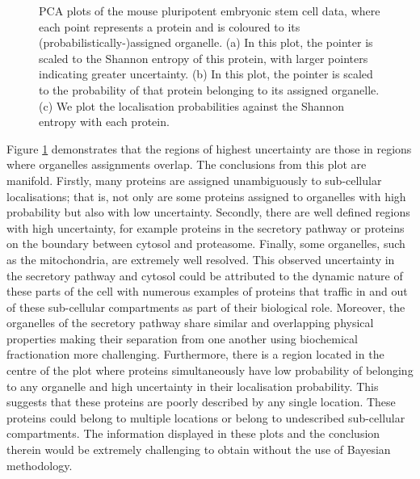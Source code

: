 \documentclass[12pt,english]{article}\usepackage[]{graphicx}\usepackage[]{color}
\newenvironment{knitrout}{}{} %
\begin{document}
\begin{figure}[h]
\begin{subfigure}[t]{0.5\textwidth}
\begin{knitrout}
{}



\end{knitrout}
    \caption{}
  \end{subfigure}

  \caption{PCA plots of the mouse pluripotent embryonic stem cell data, where
    each point represents a protein and is coloured
    to its (probabilistically-)assigned organelle. (a) In this plot, the pointer is
    scaled to the Shannon entropy of this protein, with
    larger pointers indicating greater uncertainty.
    (b) In this plot, the pointer is scaled to the probability
    of that protein belonging to its assigned organelle. (c) We plot
    the localisation probabilities against the Shannon entropy
    with each protein.}
  \label{figure:proteomeuncertainty}
 \end{figure}

Figure \ref{figure:proteomeuncertainty} demonstrates that the regions
of highest uncertainty are those in regions where organelles
assignments overlap. The conclusions from this plot are
manifold. Firstly, many proteins are assigned unambiguously to
sub-cellular localisations; that is, not only are some proteins
assigned to organelles with high probability but also with low
uncertainty. Secondly, there are well defined regions with high
uncertainty, for example proteins in the secretory pathway or proteins
on the boundary between cytosol and proteasome. Finally, some
organelles, such as the mitochondria, are extremely well
resolved. This observed uncertainty in the secretory pathway and
cytosol could be attributed to the dynamic nature of these parts of
the cell with numerous examples of proteins that traffic in and out of
these sub-cellular compartments as part of their biological
role. Moreover, the organelles of the secretory pathway share similar
and overlapping physical properties making their separation from one
another using biochemical fractionation more challenging.
Furthermore, there is a region located in the centre of the plot where
proteins simultaneously have low probability of belonging to any
organelle and high uncertainty in their localisation probability.
This suggests that these proteins are poorly described by any single
location. These proteins could belong to multiple locations or belong
to undescribed sub-cellular compartments. The information displayed in
these plots and the conclusion therein would be extremely challenging
to obtain without the use of Bayesian methodology.


\clearpage
\end{document}
